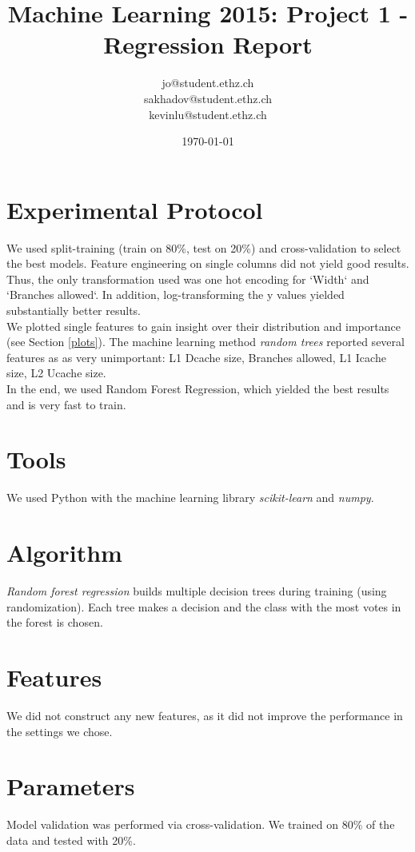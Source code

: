 \documentclass[a4paper, 11pt]{article}
\title{Machine Learning 2015: Project 1 - Regression Report}
\author{jo@student.ethz.ch\\ sakhadov@student.ethz.ch\\ kevinlu@student.ethz.ch\\}
\date{\today}
\begin{document}
\maketitle

\section*{Experimental Protocol}
We used split-training (train on 80\%, test on 20\%) and cross-validation to select the best models.
Feature engineering on single columns did not yield good results.
Thus, the only transformation used was one hot encoding for `Width` and `Branches allowed`. In addition, log-transforming the y values yielded substantially better results.\\
We plotted single features to gain insight over their distribution and importance (see Section \ref{plots}).
The machine learning method \textit{random trees} reported several features as as very unimportant: L1 Dcache size, Branches allowed, L1 Icache size, L2 Ucache size.\\
In the end, we used Random Forest Regression, which yielded the best results and is very fast to train.

\section{Tools}
We used Python with the machine learning library \textit{scikit-learn} and \textit{numpy}.

\section{Algorithm}
\textit{Random forest regression} builds multiple decision trees during training (using randomization). Each tree makes a decision and the class with the most votes in the forest is chosen.

\section{Features}
We did not construct any new features, as it did not improve the performance in the settings we chose.

\section{Parameters}
Model validation was performed via cross-validation. We trained on 80\% of the data and tested with 20\%.
\end{document}
